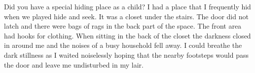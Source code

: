Did you have a special hiding place as a child?
I had a place that I frequently hid when we played hide and seek. It was a closet under the stairs. The door did not latch and there were bags of rags in the back part of the space. The front area had hooks for clothing. When sitting in the back of the closet the darkness closed in around me and the noises of a busy household fell away. I could breathe the dark stillness as I waited noiselessly hoping that the nearby footsteps would pass the door and leave me undisturbed in my lair.




